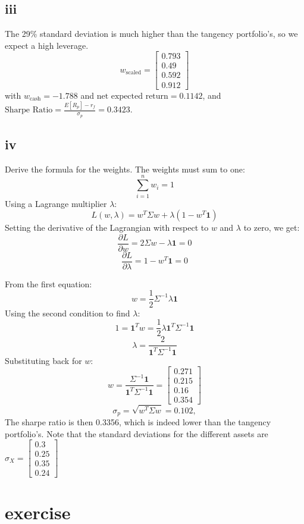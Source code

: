 \documentclass{article}
\begin{document}
\subsection*{iii}
The 29\% standard deviation is much higher than the tangency portfolio's, so we expect a high leverage.
$$\displaystyle w_\text{scaled} = \left[\begin{matrix}0.793\\0.49\\0.592\\0.912\end{matrix}\right]$$
with $w_\text{cash} = -1.788$ and $\text{net expected return} = 0.1142$, and $\text{Sharpe Ratio} = \frac{E[R_p] - r_f}{\sigma_p} = 0.3423$.

\subsection*{iv}
Derive the formula for the weights. The weights must sum to one:
\[
    \sum_{i=1}^n w_i = 1
\]
Using a Lagrange multiplier \(\lambda\):
\[
    L(w, \lambda) = w^T \Sigma w + \lambda (1 - w^T \mathbf{1})
\]
Setting the derivative of the Lagrangian with respect to \(w\) and \(\lambda\) to zero, we get:
\[
    \frac{\partial L}{\partial w} = 2 \Sigma w - \lambda \mathbf{1} = 0
\]
\[
    \frac{\partial L}{\partial \lambda} = 1 - w^T \mathbf{1} = 0
\]

From the first equation:
\[
    w = \frac{1}{2} \Sigma^{-1} \lambda \mathbf{1}
\]
Using the second condition to find \(\lambda\):
\[
    1 = \mathbf{1}^T w = \frac{1}{2} \lambda \mathbf{1}^T \Sigma^{-1} \mathbf{1}
\]
\[
    \lambda = \frac{2}{\mathbf{1}^T \Sigma^{-1} \mathbf{1}}
\]
Substituting back for \(w\):
\[
    w = \frac{\Sigma^{-1} \mathbf{1}}{\mathbf{1}^T \Sigma^{-1} \mathbf{1}} = \displaystyle \left[\begin{matrix}0.271\\0.215\\0.16\\0.354\end{matrix}\right]
\]
\[
    \sigma_p = \sqrt{w^T \Sigma w} = 0.102,
\]
The sharpe ratio is then 0.3356, which is indeed lower than the tangency portfolio's. Note that the standard deviations for the different assets are $\sigma_X = \displaystyle \left[\begin{matrix}0.3\\0.25\\0.35\\0.24\end{matrix}\right]$
\section{exercise}
\end{document}
